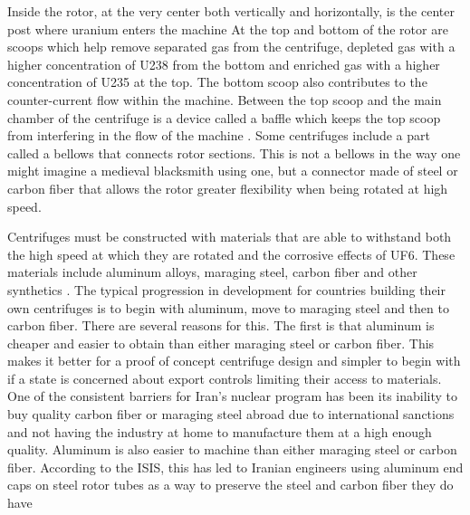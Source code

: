 Inside the rotor, at the very center both vertically and horizontally, is the center post where uranium enters the machine\cite{Olander_1981} %
At the top and bottom of the rotor are scoops which help remove separated gas from the centrifuge, depleted gas with a higher concentration of \gls{U238} from the bottom and enriched gas with a higher concentration of \gls{U235} at the top. The bottom scoop also contributes to the counter-current flow within the machine. Between the top scoop and the main chamber of the centrifuge is a device called a baffle which keeps the top scoop from interfering in the flow of the machine . Some centrifuges include a part called a bellows that connects rotor sections. This is not a bellows in the way one might imagine a medieval blacksmith using one, but a connector made of steel or carbon fiber that allows the rotor greater flexibility when being rotated at high speed.

Centrifuges must be constructed with materials that are able to withstand both the high speed at which they are rotated and the corrosive effects of UF6. These materials include aluminum alloys, maraging steel, carbon fiber and other synthetics\cite{shin_sung} %
. The typical progression in development for countries building their own centrifuges is to begin with aluminum, move to maraging steel and then to carbon fiber. There are several reasons for this. The first is that aluminum is cheaper and easier to obtain than either maraging steel or carbon fiber. This makes it better for a proof of concept centrifuge design and simpler to begin with if a state is concerned about export controls limiting their access to materials. One of the consistent barriers for Iran's nuclear program has been its inability to buy quality carbon fiber or maraging steel abroad due to international sanctions and not having the industry at home to manufacture them at a high enough quality. Aluminum is also easier to machine than either maraging steel or carbon fiber. According to the \gls{ISIS}, this has led to Iranian engineers using aluminum end caps on steel rotor tubes as a way to preserve the steel and carbon fiber they do have\cite{isis_webpage} %

